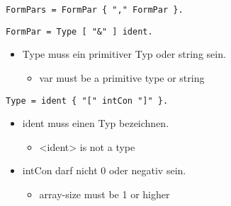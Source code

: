 \begin{samepage}
\begin{lstlisting}[language=EBNF]
FormPars = FormPar { "," FormPar }.
\end{lstlisting}
\end{samepage}


\begin{samepage}
\begin{lstlisting}[language=EBNF]
FormPar = Type [ "&" ] ident.
\end{lstlisting}
\begin{itemize}
  \item Type muss ein primitiver Typ oder string sein.
  \begin{itemize}
    \item var must be a primitive type or string
  \end{itemize}
\end{itemize}
\end{samepage}


\begin{samepage}
\begin{lstlisting}[language=EBNF]
Type = ident { "[" intCon "]" }.
\end{lstlisting}
\begin{itemize}
  \item ident muss einen Typ bezeichnen.
  \begin{itemize}
    \item <ident> is not a type
  \end{itemize}
  \item intCon darf nicht 0 oder negativ sein.
  \begin{itemize}
    \item array-size must be 1 or higher
  \end{itemize}
\end{itemize}
\end{samepage}


